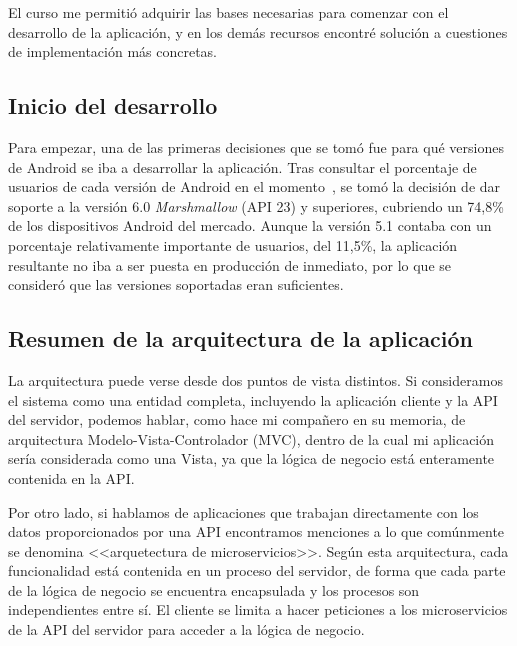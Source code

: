 El curso me permitió adquirir las bases necesarias para comenzar con el desarrollo de la aplicación, y en los demás recursos encontré solución a cuestiones de implementación más concretas. 

\subsection{Inicio del desarrollo}

Para empezar, una de las primeras decisiones que se tomó fue para qué versiones de Android se iba a desarrollar la aplicación. Tras consultar el porcentaje de usuarios de cada versión de Android en el momento~\cite{paneldecontrol}, se tomó la decisión de dar soporte a la versión 6.0 \textit{Marshmallow} (API 23) y superiores, cubriendo un 74,8\% de los dispositivos Android del mercado. Aunque la versión 5.1 contaba con un porcentaje relativamente importante de usuarios, del 11,5\%, la aplicación resultante no iba a ser puesta en producción de inmediato, por lo que se consideró que las versiones soportadas eran suficientes. 

\subsection{Resumen de la arquitectura de la aplicación}

La arquitectura puede verse desde dos puntos de vista distintos. Si consideramos el sistema como una entidad completa, incluyendo la aplicación cliente y la API del servidor, podemos hablar, como hace mi compañero en su memoria, de arquitectura Modelo-Vista-Controlador (MVC), dentro de la cual mi aplicación sería considerada como una Vista, ya que la lógica de negocio está enteramente contenida en la API. 

Por otro lado, si hablamos de aplicaciones que trabajan directamente con los datos proporcionados por una API encontramos menciones a lo que comúnmente se denomina <<arquetectura de microservicios>>. Según esta arquitectura, cada funcionalidad está contenida en un proceso del servidor, de forma que cada parte de la lógica de negocio se encuentra encapsulada y los procesos son independientes entre sí. El cliente se limita a hacer peticiones a los microservicios de la API del servidor para acceder a la lógica de negocio. 

